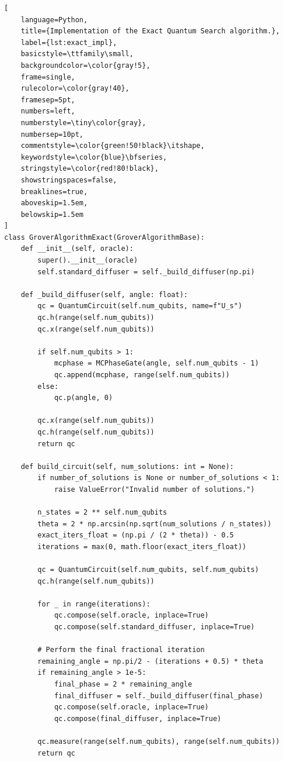 \begin{lstlisting}[
    language=Python, 
    title={Implementation of the Exact Quantum Search algorithm.}, 
    label={lst:exact_impl},              
    basicstyle=\ttfamily\small,    
    backgroundcolor=\color{gray!5},
    frame=single, 
    rulecolor=\color{gray!40},     
    framesep=5pt,                 
    numbers=left, 
    numberstyle=\tiny\color{gray}, 
    numbersep=10pt,                
    commentstyle=\color{green!50!black}\itshape, 
    keywordstyle=\color{blue}\bfseries, 
    stringstyle=\color{red!80!black},
    showstringspaces=false,
    breaklines=true,
    aboveskip=1.5em,              
    belowskip=1.5em                
]
class GroverAlgorithmExact(GroverAlgorithmBase):
    def __init__(self, oracle):
        super().__init__(oracle)
        self.standard_diffuser = self._build_diffuser(np.pi)

    def _build_diffuser(self, angle: float):
        qc = QuantumCircuit(self.num_qubits, name=f"U_s")
        qc.h(range(self.num_qubits))
        qc.x(range(self.num_qubits))

        if self.num_qubits > 1:
            mcphase = MCPhaseGate(angle, self.num_qubits - 1)
            qc.append(mcphase, range(self.num_qubits))
        else:
            qc.p(angle, 0)

        qc.x(range(self.num_qubits))
        qc.h(range(self.num_qubits))
        return qc

    def build_circuit(self, num_solutions: int = None):
        if number_of_solutions is None or number_of_solutions < 1:
            raise ValueError("Invalid number of solutions.")

        n_states = 2 ** self.num_qubits
        theta = 2 * np.arcsin(np.sqrt(num_solutions / n_states))
        exact_iters_float = (np.pi / (2 * theta)) - 0.5
        iterations = max(0, math.floor(exact_iters_float))

        qc = QuantumCircuit(self.num_qubits, self.num_qubits)
        qc.h(range(self.num_qubits))

        for _ in range(iterations):
            qc.compose(self.oracle, inplace=True)
            qc.compose(self.standard_diffuser, inplace=True)

        # Perform the final fractional iteration
        remaining_angle = np.pi/2 - (iterations + 0.5) * theta
        if remaining_angle > 1e-5:
            final_phase = 2 * remaining_angle 
            final_diffuser = self._build_diffuser(final_phase)
            qc.compose(self.oracle, inplace=True)
            qc.compose(final_diffuser, inplace=True)

        qc.measure(range(self.num_qubits), range(self.num_qubits))
        return qc
\end{lstlisting}
%
%

